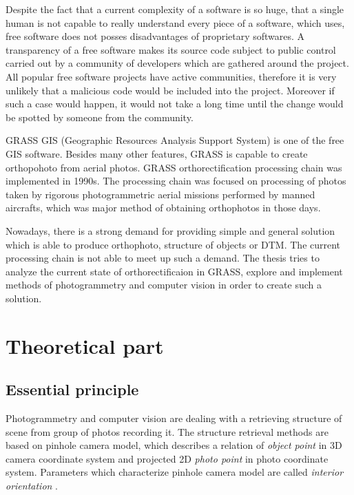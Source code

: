 \documentclass[a4paper,12pt]{article}
\newcommand{\term}[1]{
{\it #1}
}
\begin{document}

Despite the fact that a current complexity of a software is so huge,
that a single human is not capable to really understand every piece of a software, which uses,
free software does not posses disadvantages of proprietary softwares.
A transparency of a free software makes its source code subject to public control 
carried out by a community of developers which are gathered around the project.
All popular free software projects have active communities, therefore it is
very unlikely that a malicious code would be included into the project.
Moreover if such a case would happen, it would not take a long time until the change 
would be spotted by someone from the community.

GRASS GIS  (Geographic Resources Analysis Support System) is one of the free GIS software. 
Besides many other features, GRASS is capable to create orthopohoto from aerial photos.
GRASS orthorectification processing chain was implemented in 1990s.
The processing chain was focused on  processing of photos taken by rigorous 
photogrammetric aerial missions performed by manned aircrafts, which was 
major method of obtaining orthophotos in those days. 

Nowadays, there is a strong demand for  providing simple and general solution 
which is able to produce orthophoto, structure of objects or 
DTM. The current processing chain is not able to meet up such a demand.
 The thesis tries to analyze the current state of orthorectificaion in GRASS,
explore and implement methods of photogrammetry and computer vision in order 
to create such a solution.

\section{Theoretical part}


\subsection{Essential principle}
\label{sec:ess_princip}

Photogrammetry and computer vision are dealing with  a retrieving structure of scene from group of photos 
 recording it. The structure retrieval methods are based on pinhole camera model, which 
describes a relation of \term{object point} in 
3D camera coordinate system and projected 2D \term{photo point} in photo coordinate system.
Parameters which characterize pinhole camera model are called \term{interior orientation}.
\end{document}
